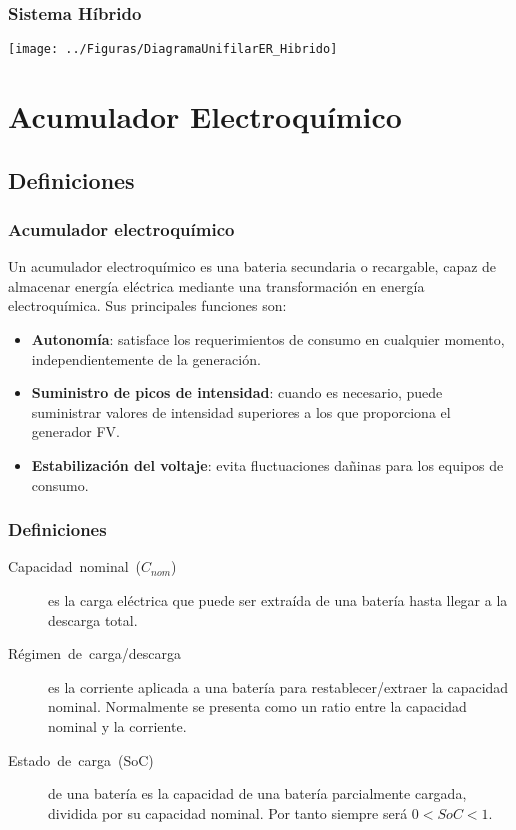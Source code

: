 \documentclass[serif, xcolor=dvipsnames]{beamer}
\begin{document}
\begin{frame}
\frametitle{Sistema Híbrido}

\begin{center}
\texttt{[image: ../Figuras/DiagramaUnifilarER\_Hibrido]}
\par\end{center}


\end{frame}

\section{Acumulador Electroquímico}


\subsection{Definiciones}


\begin{frame}
\frametitle{Acumulador electroquímico}

Un acumulador electroquímico es una bateria secundaria o recargable,
capaz de almacenar energía eléctrica mediante una transformación en
energía electroquímica. Sus principales funciones son:
\begin{itemize}
\item \textbf{Autonomía}: satisface los requerimientos de consumo en cualquier
momento, independientemente de la generación.
\item \textbf{Suministro de picos de intensidad}: cuando es necesario, puede
suministrar valores de intensidad superiores a los que proporciona
el generador FV.
\item \textbf{Estabilización del voltaje}: evita fluctuaciones dañinas para
los equipos de consumo.
\end{itemize}

\end{frame}

\begin{frame}
\frametitle{Definiciones}
\begin{description}
\item [{Capacidad~nominal~($C_{nom}$)}] es la carga eléctrica que puede
ser extraída de una batería hasta llegar a la descarga total.
\item [{Régimen~de~carga/descarga}] es la corriente aplicada a una batería
para restablecer/extraer la capacidad nominal. Normalmente se presenta
como un ratio entre la capacidad nominal y la corriente. 
\item [{Estado~de~carga~(SoC)}] de una batería es la capacidad de una
batería parcialmente cargada, dividida por su capacidad nominal. Por
tanto siempre será $0<SoC<1$.
\end{description}

\end{frame}
\end{document}
